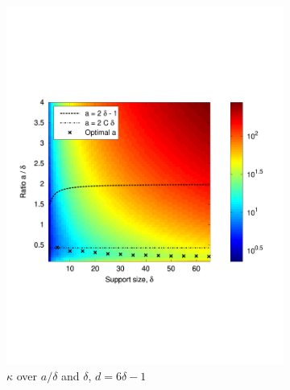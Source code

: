   \begin{figure}
    \centering
    \begin{subfigure}[b]{.49\textwidth}
      \centering
      \includegraphics[width=\textwidth,trim={.4in 2.5in .8in 2.5in}]{figs/flattable}
      \caption{$\kappa$ over $a / \delta$ and $\delta$, $d = 6 \delta - 1$}
      \label{fig:flattable}
    \end{subfigure}
    \begin{subfigure}[b]{.49\textwidth}
      \centering

\end{subfigure}
\end{figure}
